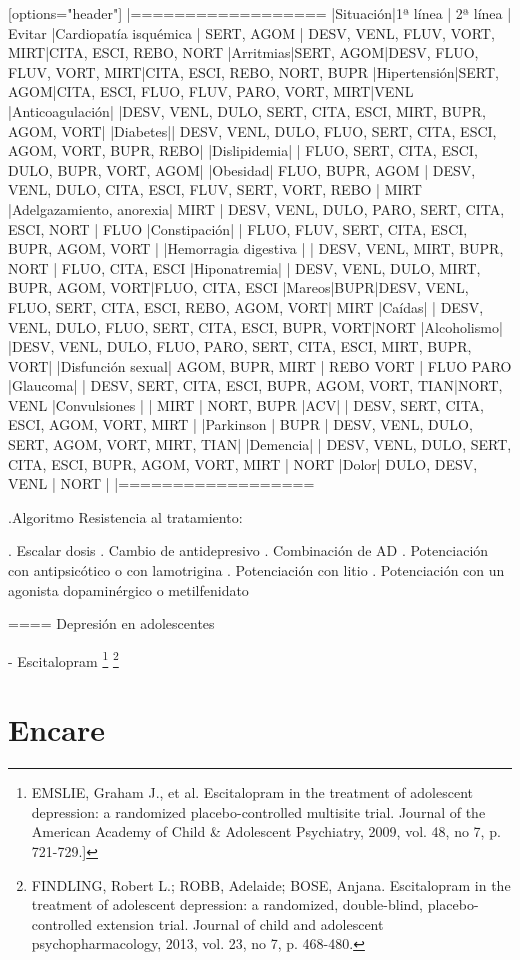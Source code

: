 [options="header"]
|==================
|Situación|1ª línea | 2ª línea | Evitar
|Cardiopatía isquémica | SERT, AGOM | DESV, VENL, FLUV, VORT, MIRT|CITA, ESCI, REBO, NORT
|Arritmias|SERT, AGOM|DESV, FLUO, FLUV, VORT, MIRT|CITA, ESCI, REBO, NORT, BUPR
|Hipertensión|SERT, AGOM|CITA, ESCI, FLUO, FLUV, PARO, VORT, MIRT|VENL
|Anticoagulación| |DESV, VENL, DULO, SERT, CITA, ESCI, MIRT, BUPR, AGOM, VORT|
|Diabetes|| DESV, VENL, DULO, FLUO, SERT, CITA, ESCI, AGOM, VORT, BUPR, REBO|
|Dislipidemia| | FLUO, SERT, CITA, ESCI, DULO, BUPR, VORT, AGOM|
|Obesidad| FLUO, BUPR, AGOM | DESV, VENL, DULO, CITA, ESCI, FLUV, SERT, VORT, REBO | MIRT
|Adelgazamiento, anorexia| MIRT | DESV, VENL, DULO, PARO, SERT, CITA, ESCI, NORT | FLUO
|Constipación| | FLUO, FLUV, SERT, CITA, ESCI, BUPR, AGOM, VORT |
|Hemorragia digestiva | | DESV, VENL, MIRT, BUPR, NORT | FLUO, CITA, ESCI
|Hiponatremia| | DESV, VENL, DULO, MIRT, BUPR, AGOM, VORT|FLUO, CITA, ESCI
|Mareos|BUPR|DESV, VENL, FLUO, SERT, CITA, ESCI, REBO, AGOM, VORT| MIRT
|Caídas| | DESV, VENL, DULO, FLUO, SERT, CITA, ESCI, BUPR, VORT|NORT
|Alcoholismo| |DESV, VENL, DULO, FLUO, PARO, SERT, CITA, ESCI, MIRT, BUPR, VORT|
|Disfunción sexual| AGOM, BUPR, MIRT | REBO VORT | FLUO PARO
|Glaucoma| | DESV, SERT, CITA, ESCI, BUPR, AGOM, VORT, TIAN|NORT, VENL
|Convulsiones | | MIRT | NORT, BUPR
|ACV| | DESV, SERT, CITA, ESCI, AGOM, VORT, MIRT |
|Parkinson | BUPR | DESV, VENL, DULO, SERT, AGOM, VORT, MIRT, TIAN|
|Demencia| | DESV, VENL, DULO, SERT, CITA, ESCI, BUPR, AGOM, VORT, MIRT | NORT
|Dolor| DULO, DESV, VENL | NORT |
|==================

.Algoritmo
Resistencia al tratamiento:

. Escalar dosis
. Cambio de antidepresivo
. Combinación de AD
. Potenciación con antipsicótico o con lamotrigina
. Potenciación con litio
. Potenciación con un agonista dopaminérgico o metilfenidato

==== Depresión en adolescentes

- Escitalopram \footnote{EMSLIE, Graham J., et al. Escitalopram in the treatment of adolescent depression: a randomized placebo-controlled multisite trial. Journal of the American Academy of Child \& Adolescent Psychiatry, 2009, vol. 48, no 7, p. 721-729.]} \footnote{FINDLING, Robert L.; ROBB, Adelaide; BOSE, Anjana. Escitalopram in the treatment of adolescent depression: a randomized, double-blind, placebo-controlled extension trial. Journal of child and adolescent psychopharmacology, 2013, vol. 23, no 7, p. 468-480.}
\section*{Encare}
